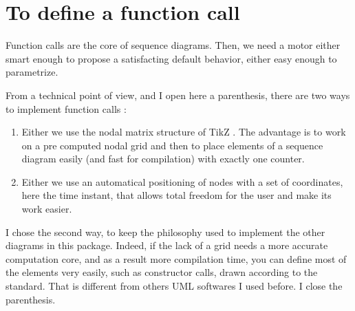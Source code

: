 \documentclass[a4paper,11pt]{report}
\newcommand{\inputTikZ}[1]{%
  }%
\newcommand{\inputTikZ}[1]{%
    \texttt{[image: fig/\#1.pdf]}%
  }%
\newcommand{\TikZ}{{\sc TikZ} \xspace}
\begin{document}
\medskip

\begin{minipage}{0.5\textwidth}

\end{minipage}
\begin{minipage}{0.5\textwidth}
\begin{center}
\inputTikZ{objectscale}
\end{center}
\end{minipage}

\begin{minipage}{0.5\textwidth}

\end{minipage}
\begin{minipage}{0.5\textwidth}
\begin{center}
\inputTikZ{objectfont}
\end{center}
\end{minipage}

\section{To define a function call}\label{s.calls}

Function calls are the core of sequence diagrams. Then, we need a motor either smart enough to propose a satisfacting default behavior, either easy enough to parametrize.

From a technical point of view, and I open here a parenthesis, there are two ways to implement function calls :

\begin{enumerate}
\item Either we use the nodal matrix structure of \TikZ. The advantage is to work on a pre computed nodal grid and then to place elements of a sequence diagram easily (and fast for compilation) with exactly one counter.
\item Either we use an automatical positioning of nodes with a set of coordinates, here the time instant, that allows total freedom for the user and make its work easier.
\end{enumerate}

I chose the second way, to keep the philosophy used to implement the other diagrams in this package. Indeed, if the lack of a grid needs a more accurate computation core, and as a result more compilation time, you can define most of the elements very easily, such as constructor calls, drawn according to the standard. That is different from others UML softwares I used before. I close the parenthesis.
\end{document}
